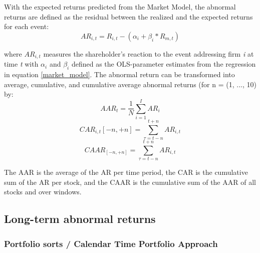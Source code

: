  With the expected returns predicted from the Market Model, the abnormal returns are defined as the residual between the realized and the expected returns for each event:
 \begin{equation}
     AR_{i,t} = R_{i,t} - (\alpha_i + \beta_i * R_{m,t})
 \end{equation}

 where $AR_{i,t}$ measures the shareholder's reaction to the event addressing firm \textit{i} at time \textit{t}  with $\alpha_i$ and $\beta_i$ defined as the OLS-parameter estimates from the regression in equation \ref{market_model}. The abnormal return can be transformed into average, cumulative, and cumulative average abnormal returns (for n = (1, ..., 10) by: 
  \begin{equation}
     AAR_t = \frac{1}{N} \sum_{i=1} ^{I} AR_i
 \end{equation}
 \begin{equation}
     CAR_{i,t}[-n,+n] = \sum_{\tau = t-n} ^{t+n} AR_{i,t}
 \end{equation}
 \begin{equation}
     CAAR_{[-n,+n]} = \sum_{\tau = t-n} ^{t+n} AR_{i,t}
 \end{equation}
 
 The AAR is the average of the AR per time period, the CAR is the cumulative sum of the AR per stock, and the CAAR is the cumulative sum of the AAR of all stocks and over windows. 



 

\subsection{Long-term abnormal returns}

\subsubsection{Portfolio sorts / Calendar Time Portfolio Approach}






